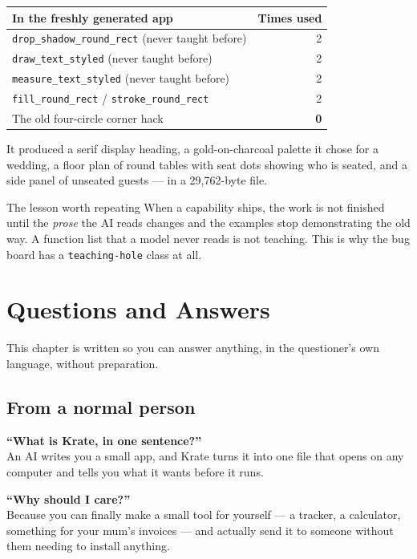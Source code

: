 \documentclass[11pt,a4paper]{report}
\begin{document}
\begin{center}
\begin{tabular}{lr}
\toprule
\textbf{In the freshly generated app} & \textbf{Times used} \\
\midrule
\texttt{drop\_shadow\_round\_rect} (never taught before) & 2 \\
\texttt{draw\_text\_styled} (never taught before) & 2 \\
\texttt{measure\_text\_styled} (never taught before) & 2 \\
\texttt{fill\_round\_rect} / \texttt{stroke\_round\_rect} & 2 \\
The old four-circle corner hack & \textbf{0} \\
\bottomrule
\end{tabular}
\end{center}

It produced a serif display heading, a gold-on-charcoal palette it chose
for a wedding, a floor plan of round tables with seat dots showing who is
seated, and a side panel of unseated guests --- in a 29{,}762-byte file.

\begin{factbox}{The lesson worth repeating}
When a capability ships, the work is not finished until the \emph{prose}
the AI reads changes and the examples stop demonstrating the old way. A
function list that a model never reads is not teaching. This is why the bug
board has a \texttt{teaching-hole} class at all.
\end{factbox}

\chapter{Questions and Answers}

This chapter is written so you can answer anything, in the questioner's own
language, without preparation.

\section{From a normal person}

\textbf{``What is Krate, in one sentence?''}\\
An AI writes you a small app, and Krate turns it into one file that opens
on any computer and tells you what it wants before it runs.

\textbf{``Why should I care?''}\\
Because you can finally make a small tool for yourself --- a tracker, a
calculator, something for your mum's invoices --- and actually send it to
someone without them needing to install anything.
\end{document}

